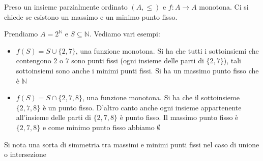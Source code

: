Preso un insieme parzialmente ordinato $(A,\leq)$ e $f:A\to A$ monotona. Ci si
chiede se esistono un massimo e un minimo punto fisso.
\begin{esempio}
  Prendiamo $A=2^\mathbb{N}$ e $S\subseteq \mathbb{N}$. Vediamo vari esempi:
  \begin{itemize}
    \item $f(S)=S\cup\{2, 7\}$, una funzione monotona. Si ha che tutti i
    sottoinsiemi che contengono $2$ o $7$ sono punti fissi (ogni insieme delle
    parti di $\{2, 7\}$), tali sottoinsiemi
    sono anche i minimi punti fissi. Si ha un massimo punto fisso che è
    $\mathbb{N}$
    \item $f(S)=S\cap\{2, 7, 8\}$, una funzione monotona. Si ha che il
    sottoinsieme $\{2, 7, 8\}$ è un punto fisso. D'altro canto anche ogni insieme
    appartenente all'insieme delle parti di $\{2, 7, 8\}$ è punto fisso. Il
    massimo punto fisso è $\{2, 7, 8\}$ e come minimo punto fisso abbiamo
    $\emptyset$ 
  \end{itemize}
  Si nota una sorta di simmetria tra massimi e minimi punti fissi nel caso di
  unione o intersezione
\end{esempio}
